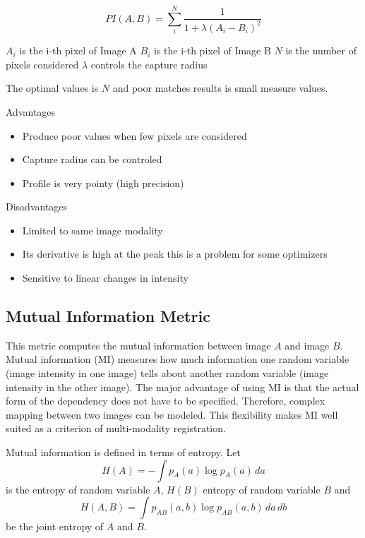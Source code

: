 \begin{equation}
PI(A,B) =  \sum_i^N \frac{ 1 }{ 1 + \lambda \left( A_i - B_i \right) ^ 2 }
\end{equation}
\begin{center}
$A_i$ is the i-th pixel of Image A 
$B_i$ is the i-th pixel of Image B
$N$ is the number of pixels considered
$\lambda$ controls the capture radius
\end{center}

The optimal values is $N$ and poor matches results is small measure
values.

Advantages
\begin{itemize}
\item Produce poor values when few pixels are considered
\item Capture radius can be controled
\item Profile is very pointy (high precision)
\end{itemize}

Disadvantages
\begin{itemize}
\item Limited to same image modality
\item Its derivative is high at the peak this is a problem for some optimizers
\item Sensitive to linear changes in intensity
\end{itemize}


\subsection{Mutual Information Metric}
This metric computes the mutual information between image $A$ and image $B$.
Mutual information (MI) measures how much information one random variable
(image intensity in one image) tells about another random variable 
(image intensity in the other image). The major advantage of using
MI is that the actual form of the dependency does not have to be specified. 
Therefore, complex mapping between two images can be modeled. 
This flexibility makes MI well suited as a criterion of multi-modality
registration.

Mutual information is defined in terms of entropy. Let
\begin{equation}
H(A) = - \int p_A(a) \log p_A(a)\, da
\end{equation}
is the entropy of random variable $A$, $H(B)$ entropy of 
random variable $B$ and 
\begin{equation}
H(A,B) = \int p_{AB}(a,b) \log p_{AB}(a,b)\,da\,db
\end{equation}
be the joint entropy of $A$ and $B$.

